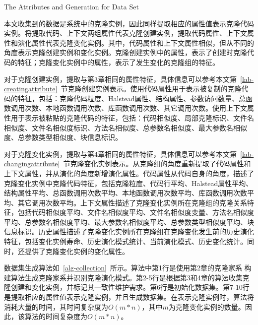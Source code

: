 {The Attributes and Generation for Data Set}

本文收集到的数据是系统中的克隆实例，因此同样提取相应的属性值表示克隆代码实例。将提取代码、上下文两组属性代表克隆创建实例，提取代码属性、上下文属性和演化属性代表克隆变化实例。其中，代码属性和上下文属性相似，但从不同的角度表示克隆创建实例和变化实例。克隆创建实例中的属性，表示了创建时克隆代码的特征；克隆变化实例中的属性，表示了发生变化的克隆组的特征。

对于克隆创建实例，提取与第3章相同的属性特征，具体信息可以参考本文第~\ref{lab-creatingattribute}~节克隆创建实例表示。使用代码属性用于表示被复制的克隆代码的特征，包括：克隆代码粒度、Halstead属性、结构属性、参数访问数量、总函数调用次数、本地函数调用次数、库函数调用次数、其它调用次数。使用上下文属性用于表示被粘贴的克隆代码的特征，包括：代码相似度、局部克隆标识、文件名相似度、文件名相似度标识、方法名相似度、总参数名相似度、最大参数名相似度、总参数类型相似度、块信息标识。

对于克隆变化实例，提取与第4章相同的属性特征，具体信息可以参考本文第~\ref{lab-changingattribute}~节克隆变化实例表示。从克隆组的角度重新提取了代码属性和上下文属性，并从演化的角度新增演化属性。代码属性从代码自身的角度，描述了克隆变化实例中克隆代码特征，包括克隆粒度、代码行平均、Halstead属性平均、结构属性平均、总函数调用次数平均、本地函数调用次数平均、库函数调用次数平均、其它调用次数平均。上下文属性描述了克隆变化实例所在克隆组的克隆关系特征，包括代码相似度平均、文件名相似度平均、文件名相似度变量、方法名相似度平均、总参数名相似度平均、最大参数名相似度平均、总参数类型相似度平均、块信息标识。历史属性描述了克隆变化实例所在克隆组在克隆变化发生前的历史演化特征，包括变化实例寿命、历史演化模式统计、当前演化模式、历史变化统计。同时，还提供了克隆变化实例的变化属性。

数据集生成算法如~\ref{alg-collection}~所示。算法中第1行是使用第2章的克隆家系 构建算法生成克隆家系并识别克隆演化模式。第2-5行是根据第3和4章的算法收集克隆创建和变化实例，并标记其一致性维护需求。第6行是初始化数据集。第7-10行是提取相应的属性值表示克隆实例，并且生成数据集。在表示克隆实例时，算法将消耗大量的时间，其时间复杂度为$O(m*n)$，其中$m$为克隆变化实例的数量。因此，该算法的时间复杂度为$O(m*n)$。

